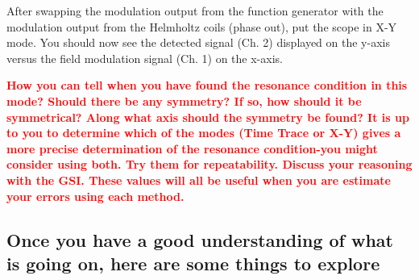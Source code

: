 \documentclass{../lab}
\begin{document}
After swapping the modulation output from the function generator with the modulation output from the Helmholtz coils (phase out), put the scope in X-Y mode. You should now see the detected signal (Ch. 2) displayed on the y-axis versus the field modulation signal (Ch. 1) on the x-axis. 
\\



\textbf{\textcolor{red}{How you can tell when you have found the resonance condition in this mode? Should there be any symmetry? If so, how should it be symmetrical? Along what axis should the symmetry be found? It is up to you to determine which of the modes (Time Trace or X-Y) gives a more precise determination of the resonance condition-you might consider using both. Try them for repeatability. Discuss your reasoning with the GSI. These values will all be useful when you are estimate your errors using each method.}}

\newpage

\subsection{Once you have a good understanding of what is going on, here are some things to explore}
\end{document}
